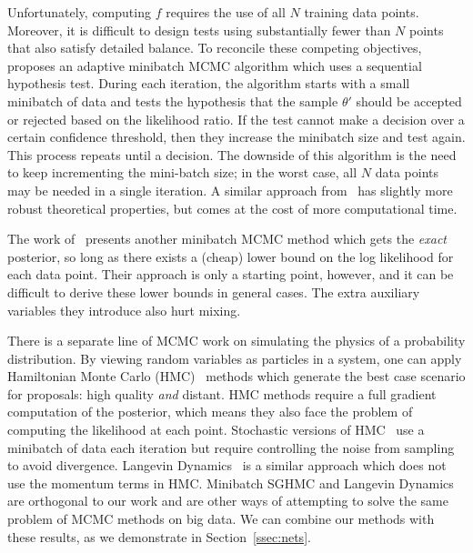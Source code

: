\documentclass{article}
\begin{document}
Unfortunately, computing $f$ requires the use of all $N$ training data points. Moreover, it is
difficult to design tests using substantially fewer than $N$ points that also satisfy detailed
balance. To reconcile these competing objectives,~\cite{cutting_mh_2014} proposes an adaptive
minibatch MCMC algorithm which uses a sequential hypothesis test. During each iteration, the
algorithm starts with a small minibatch of data and tests the hypothesis that the sample $\theta'$
should be accepted or rejected based on the likelihood ratio. If the test cannot make a decision
over a certain confidence threshold, then they increase the minibatch size and test again. This
process repeats until a decision.  The downside of this algorithm is the need to keep incrementing
the mini-batch size; in the worst case, all $N$ data points may be needed in a single iteration.  A
similar approach from~\cite{icml2014c1_bardenet14} has slightly more robust theoretical properties,
but comes at the cost of more computational time.

The work of~\cite{conf/uai/MaclaurinA14} presents another minibatch MCMC method which gets the
\emph{exact} posterior, so long as there exists a (cheap) lower bound on the log likelihood for each
data point. Their approach is only a starting point, however, and it can be difficult to derive
these lower bounds in general cases. The extra auxiliary variables they introduce also hurt mixing.

There is a separate line of MCMC work on simulating the physics of a probability distribution. By
viewing random variables as particles in a system, one can apply Hamiltonian Monte Carlo
(HMC)~\cite{mcmc_hamiltonian_2010} methods which generate the best case scenario for proposals: high
quality \emph{and} distant.  HMC methods require a full gradient computation of the posterior, which
means they also face the problem of computing the likelihood at each point. Stochastic versions of
HMC~\cite{sghmc_2014,stochastic_thermostats_2014} use a minibatch of data each iteration but require
controlling the noise from sampling to avoid divergence. Langevin
Dynamics~\cite{langevin_2011,conf/icml/AhnBW12} is a similar approach which does not use the
momentum terms in HMC.  Minibatch SGHMC and Langevin Dynamics are orthogonal to our work and are
other ways of attempting to solve the same problem of MCMC methods on big data. We can combine our
methods with these results, as we demonstrate in Section~\ref{ssec:nets}.

\end{document}
